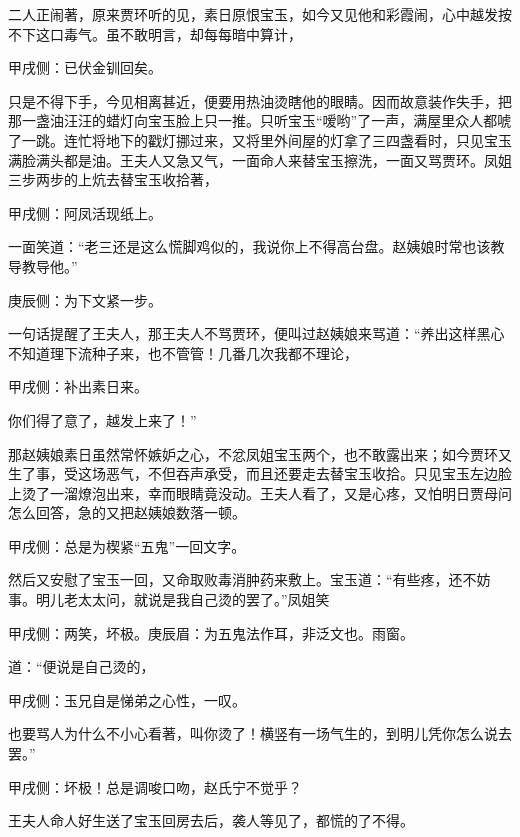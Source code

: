 \begin{parag}
    二人正闹著，原来贾环听的见，素日原恨宝玉，如今又见他和彩霞闹，心中越发按不下这口毒气。虽不敢明言，却每每暗中算计，\begin{note}甲戌侧：已伏金钏回矣。\end{note}只是不得下手，今见相离甚近，便要用热油烫瞎他的眼睛。因而故意装作失手，把那一盏油汪汪的蜡灯向宝玉脸上只一推。只听宝玉“嗳哟”了一声，满屋里众人都唬了一跳。连忙将地下的戳灯挪过来，又将里外间屋的灯拿了三四盏看时，只见宝玉满脸满头都是油。王夫人又急又气，一面命人来替宝玉擦洗，一面又骂贾环。凤姐三步两步的上炕去替宝玉收拾著，\begin{note}甲戌侧：阿凤活现纸上。\end{note}一面笑道：“老三还是这么慌脚鸡似的，我说你上不得高台盘。赵姨娘时常也该教导教导他。”\begin{note}庚辰侧：为下文紧一步。\end{note}一句话提醒了王夫人，那王夫人不骂贾环，便叫过赵姨娘来骂道：“养出这样黑心不知道理下流种子来，也不管管！几番几次我都不理论，\begin{note}甲戌侧：补出素日来。\end{note}你们得了意了，越发上来了！”
\end{parag}


\begin{parag}
    那赵姨娘素日虽然常怀嫉妒之心，不忿凤姐宝玉两个，也不敢露出来；如今贾环又生了事，受这场恶气，不但吞声承受，而且还要走去替宝玉收拾。只见宝玉左边脸上烫了一溜燎泡出来，幸而眼睛竟没动。王夫人看了，又是心疼，又怕明日贾母问怎么回答，急的又把赵姨娘数落一顿。\begin{note}甲戌侧：总是为楔紧“五鬼”一回文字。\end{note}然后又安慰了宝玉一回，又命取败毒消肿药来敷上。宝玉道：“有些疼，还不妨事。明儿老太太问，就说是我自己烫的罢了。”凤姐笑\begin{note}甲戌侧：两笑，坏极。庚辰眉：为五鬼法作耳，非泛文也。雨窗。\end{note}道：“便说是自己烫的，\begin{note}甲戌侧：玉兄自是悌弟之心性，一叹。\end{note}也要骂人为什么不小心看著，叫你烫了！横竖有一场气生的，到明儿凭你怎么说去罢。”\begin{note}甲戌侧：坏极！总是调唆口吻，赵氏宁不觉乎？\end{note}王夫人命人好生送了宝玉回房去后，袭人等见了，都慌的了不得。
\end{parag}


